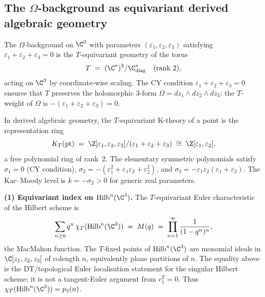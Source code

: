 \subsection{The \texorpdfstring{$\Omega$}{Omega}-background as equivariant derived algebraic geometry}
\label{subsec:omega-equivariant-dag}

The $\Omega$-background on $\C^3$ with parameters $(\varepsilon_1, \varepsilon_2, \varepsilon_3)$ satisfying $\varepsilon_1 + \varepsilon_2 + \varepsilon_3 = 0$ is the $T$-equivariant geometry of the torus
\begin{equation}
 T \;=\; (\C^*)^3 / \C^*_{\mathrm{diag}} \quad (\text{rank } 2),
 \label{eq:cy-torus}
\end{equation}
acting on $\C^3$ by coordinate-wise scaling. The CY condition $\varepsilon_1 + \varepsilon_2 + \varepsilon_3 = 0$ ensures that $T$ preserves the holomorphic $3$-form $\Omega = dz_1 \wedge dz_2 \wedge dz_3$: the $T$-weight of $\Omega$ is $-(\varepsilon_1 + \varepsilon_2 + \varepsilon_3) = 0$.

In derived algebraic geometry, the $T$-equivariant K-theory of a point is the representation ring
\begin{equation}
 K_T(\mathrm{pt}) \;=\; \Z[\varepsilon_1, \varepsilon_2, \varepsilon_3] / (\varepsilon_1 + \varepsilon_2 + \varepsilon_3) \;\cong\; \Z[\varepsilon_1, \varepsilon_2],
 \label{eq:kt-ring}
\end{equation}
a free polynomial ring of rank~$2$. The elementary symmetric polynomials satisfy $\sigma_1 = 0$ (CY condition), $\sigma_2 = -(\varepsilon_1^2 + \varepsilon_1 \varepsilon_2 + \varepsilon_2^2)$, and $\sigma_3 = -\varepsilon_1 \varepsilon_2(\varepsilon_1 + \varepsilon_2)$. The Kac--Moody level is $k = -\sigma_2 > 0$ for generic real parameters.

\medskip
\noindent\textbf{(1) Equivariant index on $\mathrm{Hilb}^n(\C^3)$.}
The $T$-equivariant Euler characteristic of the Hilbert scheme is
\begin{equation}
 \sum_{n \geq 0} q^n \, \chi_T(\mathrm{Hilb}^n(\C^3)) \;=\; M(q) \;=\; \prod_{n=1}^{\infty} \frac{1}{(1-q^n)^n},
 \label{eq:equiv-index-hilb-c3}
\end{equation}
the MacMahon function. The \(T\)-fixed points of
\(\mathrm{Hilb}^n(\C^3)\) are monomial ideals in
\(\C[z_1,z_2,z_3]\) of colength \(n\), equivalently plane partitions of
\(n\). The equality above is the DT/topological Euler localisation
statement for the singular Hilbert scheme; it is not a tangent-Euler
argument from \(c_1^T=0\). Thus
\(\chi_T(\mathrm{Hilb}^n(\C^3))=p_3(n)\).

